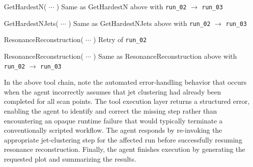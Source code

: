 \documentclass[11pt,oneside]{article}
\numberwithin{equation}{section}
\begin{document}
\begin{orchestralagentmessage}
    \begin{orchestraltoolmessage}{GetHardestN( $\cdots$ )}
    Same as \textsf{GetHardestN} above with \texttt{run\_02} $\to$ \texttt{run\_03}
    \end{orchestraltoolmessage}


    \begin{orchestraltoolmessage}{GetHardestNJets( $\cdots$ )}
    Same as \textsf{GetHardestNJets} above with \texttt{run\_02} $\to$ \texttt{run\_03}
    \end{orchestraltoolmessage}


    \begin{orchestraltoolmessage}{ResonanceReconstruction( $\cdots$ )}
    Retry of \texttt{run\_02}
    \end{orchestraltoolmessage}

\begin{orchestraltoolmessage}{ResonanceReconstruction( $\cdots$ )}
    Same as \textsf{ResonanceReconstruction} above with \texttt{run\_02} $\to$ \texttt{run\_03}
    \end{orchestraltoolmessage}

\end{orchestralagentmessage}

In the above tool chain, note the automated error-handling behavior that occurs when the agent incorrectly assumes that jet clustering had already been completed for all scan points. 
The tool execution layer returns a structured error, enabling the agent to identify and correct the missing step rather than encountering an opaque runtime failure that would typically terminate a conventionally scripted workflow. 
The agent responds by re-invoking the appropriate jet-clustering step for the affected run before successfully resuming resonance reconstruction. 
Finally, the agent finishes execution by generating the requested plot and summarizing the results.
\end{document}

